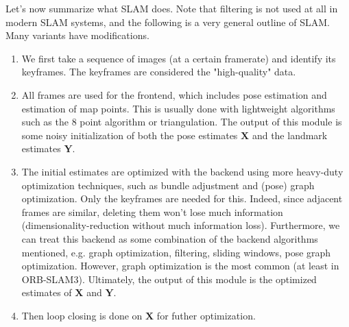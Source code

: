 \documentclass{article}
\theoremstyle{definition}
\theoremstyle{remark}
\theoremstyle{definition}
\begin{document}
Let's now summarize what SLAM does. Note that filtering is not used at all in modern SLAM systems, and the following is a very general outline of SLAM. Many variants have modifications. 
\begin{enumerate}
    \item We first take a sequence of images (at a certain framerate) and identify its keyframes. The keyframes are considered the "high-quality" data. 
    \item All frames are used for the frontend, which includes pose estimation and estimation of map points. This is usually done with lightweight algorithms such as the 8 point algorithm or triangulation. The output of this module is some noisy initialization of both the pose estimates $\mathbf{X}$ and the landmark estimates $\mathbf{Y}$. 
    \item The initial estimates are optimized with the backend using more heavy-duty optimization techniques, such as bundle adjustment and (pose) graph optimization. Only the keyframes are needed for this. Indeed, since adjacent frames are similar, deleting them won't lose much information (dimensionality-reduction without much information loss). Furthermore, we can treat this backend as some combination of the backend algorithms mentioned, e.g. graph optimization, filtering, sliding windows, pose graph optimization. However, graph optimization is the most common (at least in ORB-SLAM3). Ultimately, the output of this module is the optimized estimates of $\mathbf{X}$ and $\mathbf{Y}$. 
    \item Then loop closing is done on $\mathbf{X}$ for futher optimization. 
\end{enumerate}
\end{document}
